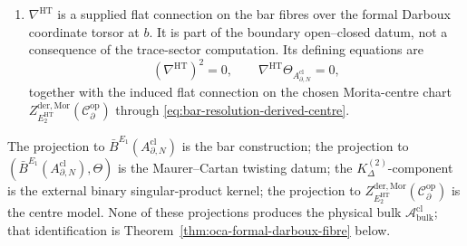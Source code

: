 \begin{thm}
\begin{enumerate}[label=\textup{(\roman*)}]
  \item \(\nabla^{\mathrm{HT}}\) is a supplied flat connection on the
        bar fibres over the formal Darboux coordinate torsor at \(b\).
        It is part of the boundary open--closed datum, not a consequence
        of the trace-sector computation.  Its defining equations are
        \[
          (\nabla^{\mathrm{HT}})^2=0,\qquad
          \nabla^{\mathrm{HT}}\Theta_{A^{\mathrm{cl}}_{\partial,N}}=0,
        \]
        together with the induced flat connection on the chosen
        Morita-centre chart
        \(Z^{\mathrm{der},\mathrm{Mor}}_{E_2^{\mathrm{HT}}}
        (\mathcal C^{\mathrm{op}}_\partial)\) through
        \eqref{eq:bar-resolution-derived-centre}.
\end{enumerate}
The projection to \(\bar B^{E_1}(A^{\mathrm{cl}}_{\partial,N})\) is
the bar construction; the projection to
  \((\bar B^{E_1}(A^{\mathrm{cl}}_{\partial,N}),\Theta)\) is the
  Maurer--Cartan twisting datum; the \(K^{(2)}_\Delta\)-component
  is the external binary singular-product kernel; the projection to
\(Z^{\mathrm{der},\mathrm{Mor}}_{E_2^{\mathrm{HT}}}(\mathcal C^{\mathrm{op}}_\partial)\)
is the centre model.  None of these projections produces
the physical bulk \(\mathcal A^{\mathrm{cl}}_{\mathrm{bulk}}\); that
identification is Theorem~\ref{thm:oca-formal-darboux-fibre}
below.
\end{thm}

